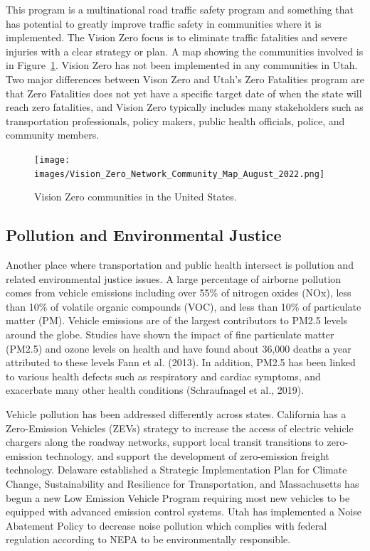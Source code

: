 \documentclass[
  letterpaper,
  DIV=11,
  numbers=noendperiod]{scrreport}
\begin{document}
This program is a multinational road traffic safety program and
something that has potential to greatly improve traffic safety in
communities where it is implemented. The Vision Zero focus is to
eliminate traffic fatalities and severe injuries with a clear strategy
or plan. A map showing the communities involved is in
Figure~\ref{fig-visionzero}. Vision Zero has not been implemented in any
communities in Utah. Two major differences between Vison Zero and Utah's
Zero Fatalities program are that Zero Fatalities does not yet have a
specific target date of when the state will reach zero fatalities, and
Vision Zero typically includes many stakeholders such as transportation
professionals, policy makers, public health officials, police, and
community members.

\begin{figure}[t]

{\centering \texttt{[image: images/Vision\_Zero\_Network\_Community\_Map\_August\_2022.png]}

}

\caption{\label{fig-visionzero}Vision Zero communities in the United
States.}

\end{figure}

\hypertarget{pollution-and-environmental-justice}{%
\subsection{Pollution and Environmental
Justice}\label{pollution-and-environmental-justice}}

Another place where transportation and public health intersect is
pollution and related environmental justice issues. A large percentage
of airborne pollution comes from vehicle emissions including over 55\%
of nitrogen oxides (NOx), less than 10\% of volatile organic compounds
(VOC), and less than 10\% of particulate matter (PM). Vehicle emissions
are of the largest contributors to PM2.5 levels around the globe.
Studies have shown the impact of fine particulate matter (PM2.5) and
ozone levels on health and have found about 36,000 deaths a year
attributed to these levels Fann et al. (2013). In addition, PM2.5 has
been linked to various health defects such as respiratory and cardiac
symptoms, and exacerbate many other health conditions (Schraufnagel et
al., 2019).

Vehicle pollution has been addressed differently across states.
California has a Zero-Emission Vehicles (ZEVs) strategy to increase the
access of electric vehicle chargers along the roadway networks, support
local transit transitions to zero-emission technology, and support the
development of zero-emission freight technology. Delaware established a
Strategic Implementation Plan for Climate Change, Sustainability and
Resilience for Transportation, and Massachusetts has begun a new Low
Emission Vehicle Program requiring most new vehicles to be equipped with
advanced emission control systems. Utah has implemented a Noise
Abatement Policy to decrease noise pollution which complies with federal
regulation according to NEPA to be environmentally responsible.
\end{document}
